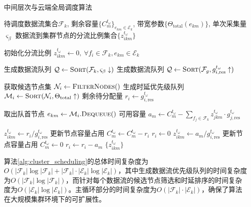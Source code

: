 \begin{breakablealgorithm}
\caption{中间层次与云端全局调度算法}
\label{alg:cluster_scheduling}
\begin{algorithmic}[1]
\REQUIRE  
  待调度数据流集合$\mathcal{F}_k$, 剩余容量$\{C^{t_\omega}_m\}_{e_{km} \in \mathcal{E}_k}$, 带宽参数$\{\Theta_{\text{total}}(e_{km})\}$, 单次采集量$\varsigma_\beta$
\ENSURE  
  数据流到集群节点的分流比例集合$\{z_{ikm}^{t_\omega}\}$

\STATE 初始化分流比例 $z_{ikm}^{t_\omega} \leftarrow 0,\ \forall f_i \in \mathcal{F}_k, e_{km} \in \mathcal{E}_k$  

\STATE 生成数据流队列 $\mathcal{Q} \leftarrow \textsc{Sort}(\mathcal{F}_k, \varsigma_\beta \downarrow)$  
\STATE 生成数据流队列 $\mathcal{Q} \leftarrow \textsc{Sort}(\mathcal{F}_g, g_{i,\text{res}}^{t_\omega} \uparrow)$ 
\ENDIF

  \STATE 获取候选节点集 $\mathcal{N}_i \leftarrow \textsc{FilterNodes}()$  
  \STATE 生成时延优先级队列 $\mathcal{M}_i \leftarrow \textsc{Sort}(\mathcal{N}_i, \Theta_{\text{total}} \uparrow)$  
  \STATE 剩余待分配量 $r_i \leftarrow g_{i,\text{res}}^{t_\omega}$

    \STATE 取出队首节点 $e_{km} \leftarrow \mathcal{M}_i.\textsc{Dequeue}()$
    \STATE 可用容量 $a_m \leftarrow C^{t_\omega}_m - \sum_{f_j \in \mathcal{F}_k} z_{jkm}^{t_\omega} \cdot g_{j,\text{res}}^{t_\omega}$
    
      \STATE $z_{ikm}^{t_\omega} \leftarrow r_i / g_{i,\text{res}}^{t_\omega}$  
      \STATE 更新节点容量占用 $C^{t_\omega}_m \leftarrow C^{t_\omega}_m - r_i$
      \STATE $r_i \leftarrow 0$
    \ELSE
      \STATE $z_{ikm}^{t_\omega} \leftarrow a_m / g_{i,\text{res}}^{t_\omega}$  
      \STATE 更新节点容量占用 $C^{t_\omega}_m \leftarrow 0$
      \STATE $r_i \leftarrow r_i - a_m$
    \ENDIF
  \ENDWHILE
\ENDFOR
\RETURN $\{z_{ikm}^{t_\omega}\}$
\end{algorithmic}
\end{breakablealgorithm}

算法\ref{alg:cluster_scheduling}的总体时间复杂度为$O(|\mathcal{F}_k| \log |\mathcal{F}_k| + |\mathcal{F}_k| \cdot |\mathcal{E}_k| \log |\mathcal{E}_k|)$，其中生成数据流优先级队列的时间复杂度为$O(|\mathcal{F}_k| \log |\mathcal{F}_k|)$，而针对每个数据流的候选节点筛选和时延排序的时间复杂度为$O(|\mathcal{E}_k| \log |\mathcal{E}_k|)$。主循环部分的时间复杂度为$O(|\mathcal{F}_k| \cdot |\mathcal{E}_k|)$，确保了算法在大规模集群环境下的可扩展性。

